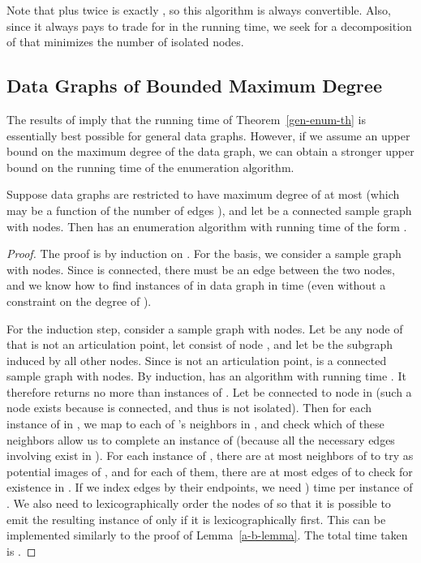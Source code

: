 Note that  plus twice  is exactly , so this algorithm is always convertible.
Also, since it always pays to trade  for  in the running time, we seek for a decomposition of  that minimizes the number of isolated nodes.

\subsection{Data Graphs of Bounded Maximum Degree}
\label{max-degree-sect}

The results of \cite{Alon81} imply that the running time of Theorem~\ref{gen-enum-th} is essentially best possible for general data graphs. However, if we assume an upper bound on the maximum degree of the data graph, we can obtain a stronger upper bound on the running time of the enumeration algorithm.

\begin{theorem}\label{bounded-degree-th}
Suppose data graphs are restricted to have maximum degree of at most  (which may be a function of the number of edges ), and let  be a connected sample graph with  nodes. Then  has an enumeration algorithm with running time of the form .
\end{theorem}

\begin{proof}
The proof is by induction on . For the basis, we consider a sample graph  with  nodes. Since  is connected, there must be an edge between the two nodes, and we know how to find instances of  in data graph  in  time (even without a constraint on the degree of ).

For the induction step, consider a sample graph  with  nodes. Let  be any node of  that is not an articulation point, let  consist of node , and let  be the subgraph induced by all other nodes. Since  is not an articulation point,  is a connected sample graph with  nodes. By induction,  has an algorithm with running time . It therefore returns no more than  instances of . Let  be connected to node  in  (such a node exists because  is connected, and thus  is not isolated). Then for each instance of  in , we map  to each of 's neighbors in , and check which of these neighbors allow us to complete an instance of  (because all the necessary edges involving  exist in ). For each instance of , there are at most  neighbors of  to try as potential images of , and for each of them, there are at most  edges of  to check for existence in . If we index edges by their endpoints, we need ) time per instance of .  We also need to lexicographically order the nodes of  so that it is possible to emit the resulting instance of  only if it is lexicographically first. This can be implemented similarly to the proof of Lemma~\ref{a-b-lemma}. The total time taken is .
\end{proof}

